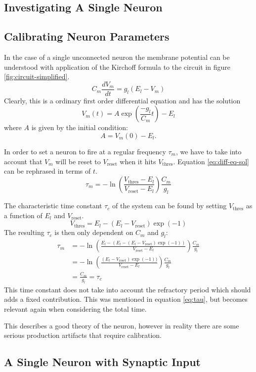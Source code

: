 \documentclass[10pt,a4paper]{article}
\begin{document}
\subsection{Investigating A Single Neuron}

\subsection{Calibrating Neuron Parameters}
In the case of a single unconnected neuron the membrane potential can be
understood with application of the Kirchoff formula to the circuit in figure
\ref{fig:circuit-simplified}.
\[
    C_m \frac{dV_m}{dt} = g_l(E_l - V_m)
\]
Clearly, this is a ordinary first order differential equation and has the
solution
\begin{equation}
    V_m(t) = A \exp(\frac{-g_l}{C_m}t) - E_l
    \label{eq:diff-eq-sol}
\end{equation}
where $A$ is given by the initial condition:
\[
    A = V_m(0) - E_l.
\]

In order to set a neuron to fire at a regular frequency $\tau_m$, we have to take
into account that $V_m$ will be reset to $V_\text{reset}$ when it hits
$V_\text{thres}$. Equation \eqref{eq:diff-eq-sol} can be rephrased in terms of
$t$.
\[
    \tau_m = -\ln(\frac{V_\text{thres} - E_l}{V_\text{reset} - E_l})
    \frac{C_m}{g_l}
\]

The characteristic time constant $\tau_c$ of the system can be found by setting
$V_\text{thres}$ as a function of $E_l$ and $V_\text{reset}$.
\[
    V_\text{thres} = E_l - (E_l - V_\text{reset})\exp(-1)
\]
The resulting $\tau_c$ is then only dependent on $C_m$ and $g_l$:
\begin{align*}
    \tau_m &= -\ln(\frac{E_l - (E_l - (E_l - V_\text{reset})\exp(-1))}{V_\text{reset} - E_l}) \frac{C_m}{g_l}\\
           &= -\ln(\frac{(E_l - V_\text{reset})\exp(-1))}{V_\text{reset} - E_l})\frac{C_m}{g_l} \\
           &= \frac{C_m}{g_l} = \tau_c
\end{align*}
This time constant does not take into account the refractory period which should
adds a fixed contribution. This was mentioned in equation \eqref{eq:tau}, but
becomes relevant again when considering the total time.

This describes a good theory of the neuron, however in reality there are some
serious production artifacts that require calibration.


\subsection{A Single Neuron with Synaptic Input}
\end{document}
